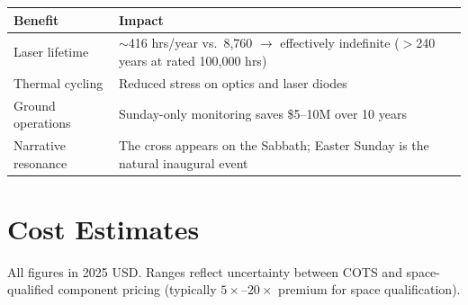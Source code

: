 \documentclass[12pt,letterpaper]{article}
\begin{document}
\begin{center}
\begin{tabular}{lp{8cm}}
\toprule
\textbf{Benefit} & \textbf{Impact} \\
\midrule
Laser lifetime & $\sim$416 hrs/year vs.\ 8{,}760 $\to$ effectively indefinite ($>$240 years at rated 100{,}000 hrs) \\
Thermal cycling & Reduced stress on optics and laser diodes \\
Ground operations & Sunday-only monitoring saves \$5--10M over 10 years \\
Narrative resonance & The cross appears on the Sabbath; Easter Sunday is the natural inaugural event \\
\bottomrule
\end{tabular}
\end{center}

\section{Cost Estimates}

All figures in 2025 USD. Ranges reflect uncertainty between COTS and
space-qualified component pricing (typically $5\times$--$20\times$ premium for
space qualification).
\end{document}

